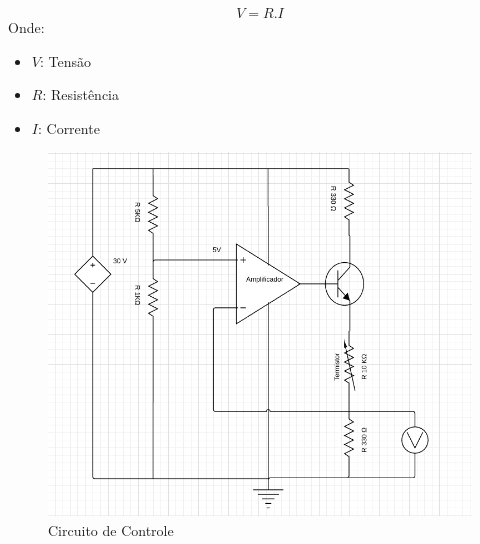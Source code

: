 \begin{equation} \label{eq:leideohm}
	V = R.I
\end{equation}
Onde:
\begin{itemize}[label=]
  	\item $V$: Tensão
  	\item $R$: Resistência
  	\item $I$: Corrente
\end{itemize}

\begin{figure}[h!]
	\begin{center}
		\includegraphics[width=1\linewidth]{images/Circuito_de_controle.png}
		\caption{Circuito de Controle}
		\label{fig:circuitoRealimentado}
	\end{center}
\end{figure}

